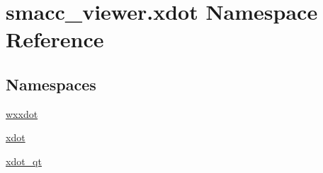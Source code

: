 \hypertarget{namespacesmacc__viewer_1_1xdot}{}\section{smacc\+\_\+viewer.\+xdot Namespace Reference}
\label{namespacesmacc__viewer_1_1xdot}
\subsection*{Namespaces}
\begin{DoxyCompactItemize}
\item 
 \hyperlink{namespacesmacc__viewer_1_1xdot_1_1wxxdot}{wxxdot}
\item 
 \hyperlink{namespacesmacc__viewer_1_1xdot_1_1xdot}{xdot}
\item 
 \hyperlink{namespacesmacc__viewer_1_1xdot_1_1xdot__qt}{xdot\+\_\+qt}
\end{DoxyCompactItemize}
